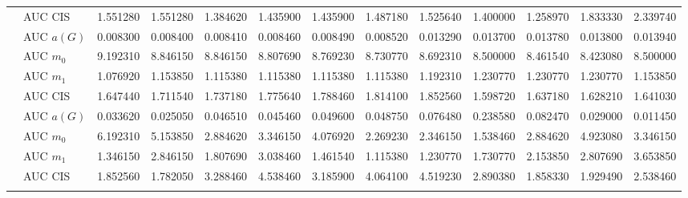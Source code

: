 \begin{table}[htbp]
\begin{tabular}{llrrrrrrrrrrr}
    & AUC CIS & 1.551280 & 1.551280 & 1.384620 & 1.435900 & 1.435900 & 1.487180 & 1.525640 & 1.400000 & 1.258970 & 1.833330 & 2.339740 \\
    \addlinespace
    \multirow{4}{*}{degree} & AUC $a(G)$ & 0.008300 & 0.008400 & 0.008410 & 0.008460 & 0.008490 & 0.008520 & 0.013290 & 0.013700 & 0.013780 & 0.013800 & 0.013940 \\
    & AUC $m_0$ & 9.192310 & 8.846150 & 8.846150 & 8.807690 & 8.769230 & 8.730770 & 8.692310 & 8.500000 & 8.461540 & 8.423080 & 8.500000 \\
    & AUC $m_1$ & 1.076920 & 1.153850 & 1.115380 & 1.115380 & 1.115380 & 1.115380 & 1.192310 & 1.230770 & 1.230770 & 1.230770 & 1.153850 \\
    & AUC CIS & 1.647440 & 1.711540 & 1.737180 & 1.775640 & 1.788460 & 1.814100 & 1.852560 & 1.598720 & 1.637180 & 1.628210 & 1.641030 \\
    \addlinespace
    \multirow{4}{*}{random} & AUC $a(G)$ & 0.033620 & 0.025050 & 0.046510 & 0.045460 & 0.049600 & 0.048750 & 0.076480 & 0.238580 & 0.082470 & 0.029000 & 0.011450 \\
    & AUC $m_0$ & 6.192310 & 5.153850 & 2.884620 & 3.346150 & 4.076920 & 2.269230 & 2.346150 & 1.538460 & 2.884620 & 4.923080 & 3.346150 \\
    & AUC $m_1$ & 1.346150 & 2.846150 & 1.807690 & 3.038460 & 1.461540 & 1.115380 & 1.230770 & 1.730770 & 2.153850 & 2.807690 & 3.653850 \\
    & AUC CIS & 1.852560 & 1.782050 & 3.288460 & 4.538460 & 3.185900 & 4.064100 & 4.519230 & 2.890380 & 1.858330 & 1.929490 & 2.538460 \\
    \addlinespace
    \bottomrule
  \end{tabular}
\end{table}

